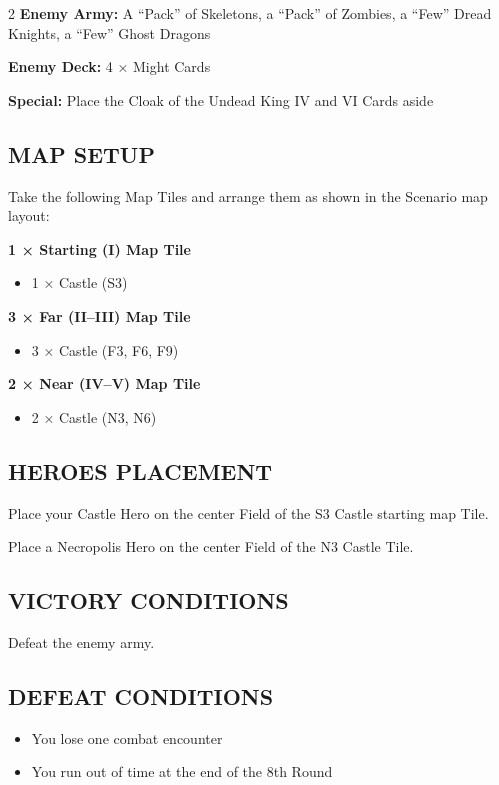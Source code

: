 \begin{multicols*}{2}
\textbf{Enemy Army:} A ``Pack'' of Skeletons, a ``Pack'' of Zombies, a ``Few'' Dread Knights, a ``Few'' Ghost Dragons

\textbf{Enemy Deck:} 4 × Might Cards

\textbf{Special:} Place the Cloak of the Undead King IV and VI Cards aside

\subsection*{\MakeUppercase{Map setup}}

Take the following Map Tiles and arrange them as shown in the Scenario map layout:

\textbf{1 × Starting (I) Map Tile}
\begin{itemize}
    \item 1 × Castle (S3)
\end{itemize}

\textbf{3 × Far (II--III) Map Tile}
\begin{itemize}
    \item 3 × Castle (F3, F6, F9)
\end{itemize}

\textbf{2 × Near (IV--V) Map Tile}
\begin{itemize}
    \item 2 × Castle (N3, N6)
\end{itemize}

\subsection*{\MakeUppercase{Heroes placement}}

Place your Castle Hero on the center Field of the S3 Castle starting map Tile.

Place a Necropolis Hero on the center Field of the N3 Castle Tile.

\subsection*{\MakeUppercase{Victory Conditions}}

Defeat the enemy army.

\subsection*{\MakeUppercase{Defeat Conditions}}
\begin{itemize}
  \item You lose one combat encounter
  \item You run out of time at the end of the 8th Round
\end{itemize}
\end{multicols*}

